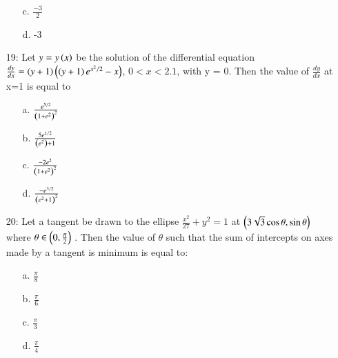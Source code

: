 \documentclass[journal,12pt,twocolumn]{IEEEtran}
\theoremstyle{remark}
\begin{document}
\begin{enumerate}
\begin{multicols}{2}
\begin{enumerate}
	    \columnbreak
    \item [c.] $\frac{-3}{2}$
    \item [d.] -3
\end{enumerate}
\end{multicols}
\item[19:] Let $y=y\left(x\right)$ be the solution of the differential equation $\frac{dy}{dx} =\left(y+1\right)\left(\left(y+1\right)e^{x^2/2}-x\right)$, $0<x<2.1$, with y = 0. Then the value of $\frac{dy}{dx}$ at x=1 is equal to
\begin{multicols}{2}
\begin{enumerate}
    \item [a.] $\frac{e^{5/2}}{\left(1+e^2\right)^2}$
    \item [b.] $\frac{5e^{1/2}}{\left(e^2\right)+1}$
	    \columnbreak
    \item [c.] $\frac{-2e^2}{\left(1+e^2\right)^2}$
    \item [d.] $\frac{-e^{3/2}}{\left(e^2+1\right)^2}$
\end{enumerate}
\end{multicols}
\item[20:] Let a tangent be drawn to the ellipse $ \frac{x^2}{27} + y^2 = 1 $ at $ \left(3\sqrt{3} \cos \theta, \sin \theta\right)$ where $\theta \in \left(0, \frac{\pi}{2}\right)$ . Then the value of $\theta$  such that the sum of intercepts on axes made by a tangent is minimum is equal to:
\begin{enumerate}
    \item [a.] $\frac{\pi}{8}$
    \item [b.]  $\frac{\pi}{6}$
    \item [c.]  $\frac{\pi}{3}$
    \item [d.]  $\frac{\pi}{4}$
\end{enumerate}

\end{enumerate}
\end{document}
